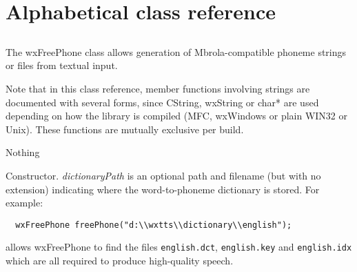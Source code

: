 \chapter{Alphabetical class reference}\label{classref}

%
\setfooter{\thepage}{}{}{}{}{\thepage}%

\section{}\label{wxfreephone}

The wxFreePhone class allows generation of Mbrola-compatible phoneme
strings or files from textual input.

Note that in this class reference, member functions involving strings are documented
with several forms, since CString, wxString or char* are used depending on how the
library is compiled (MFC, wxWindows or plain WIN32 or Unix). These functions are mutually exclusive
per build.


Nothing








Constructor. {\it dictionaryPath} is an optional path and filename (but with no extension)
indicating where the word-to-phoneme dictionary is stored. For example:

\begin{verbatim}
  wxFreePhone freePhone("d:\\wxtts\\dictionary\\english");
\end{verbatim}

allows wxFreePhone to find the files {\tt english.dct}, {\tt english.key} and {\tt english.idx} which are
all required to produce high-quality speech.

